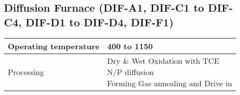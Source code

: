 \subsection{Diffusion Furnace (DIF-A1, DIF-C1 to DIF-C4, DIF-D1 to DIF-D4, DIF-F1)}\label{diffusion_furnace_machine}
\WaferClean\WaferSemiClean\WaferNonStandard

\begin{minipage}[H]{\MachinePictureMiniPageWidth}
\end{minipage}\begin{minipage}[H]{\MachineTextMiniPageWidth}
	\begin{tabular}{|p{2cm}|p{8cm}|}
		\hline
		Operating temperature &
		400 to 1150 \degreesC \\
		\hline
		Processing &
		\makecell[l]{
			\tabitem Dry \& Wet Oxidation with TCE\\
			\tabitem N/P diffusion \\
			\tabitem Forming Gas annealing and Drive in
		} \\
		\hline
	\end{tabular}
\end{minipage}